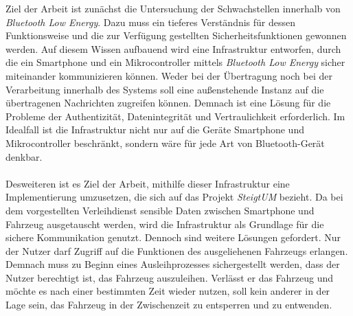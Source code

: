 Ziel der Arbeit ist zunächst die Untersuchung der Schwachstellen innerhalb von \textit{Bluetooth Low Energy}. Dazu muss ein tieferes Verständnis für dessen Funktionsweise und die zur Verfügung gestellten Sicherheitsfunktionen gewonnen werden. Auf diesem Wissen aufbauend wird eine Infrastruktur entworfen, durch die ein Smartphone und ein Mikrocontroller mittels \textit{Bluetooth Low Energy} sicher miteinander kommunizieren können. Weder bei der Übertragung noch bei der Verarbeitung innerhalb des Systems soll eine außenstehende Instanz auf die übertragenen Nachrichten zugreifen können. Demnach ist eine Lösung für die Probleme der Authentizität, Datenintegrität und Vertraulichkeit erforderlich. Im Idealfall ist die Infrastruktur nicht nur auf die Geräte Smartphone und Mikrocontroller beschränkt, sondern wäre für jede Art von Bluetooth-Gerät denkbar.
\\\\
Desweiteren ist es Ziel der Arbeit, mithilfe dieser Infrastruktur eine Implementierung umzusetzen, die sich auf das Projekt \textit{SteigtUM} bezieht. Da bei dem vorgestellten Verleihdienst sensible Daten zwischen Smartphone und Fahrzeug ausgetauscht werden, wird die Infrastruktur als Grundlage für die sichere Kommunikation genutzt. Dennoch sind weitere Lösungen gefordert. Nur der Nutzer darf Zugriff auf die Funktionen des ausgeliehenen Fahrzeugs erlangen. Demnach muss zu Beginn eines Ausleihprozesses sichergestellt werden, dass der Nutzer berechtigt ist, das Fahrzeug auszuleihen. Verlässt er das Fahrzeug und möchte es nach einer bestimmten Zeit wieder nutzen, soll kein anderer in der Lage sein, das Fahrzeug in der Zwischenzeit zu entsperren und zu entwenden.